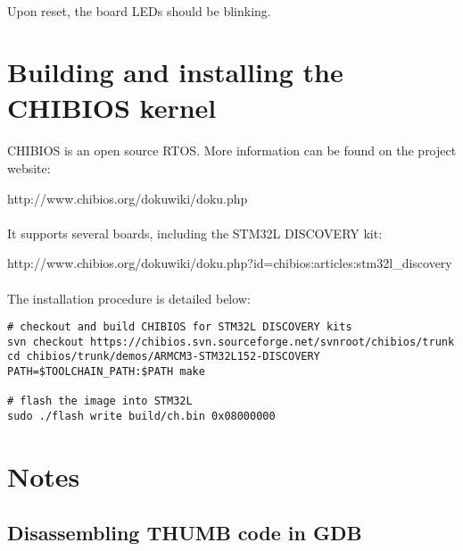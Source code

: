 \documentclass[a4paper, 11pt]{article}
\begin{document}
\paragraph{}
Upon reset, the board LEDs should be blinking.

\newpage
\section{Building and installing the CHIBIOS kernel}
\paragraph{}
CHIBIOS is an open source RTOS. More information can be found on the project website:
\begin{center}
http://www.chibios.org/dokuwiki/doku.php
\end{center}

\paragraph{}
It supports several boards, including the STM32L DISCOVERY kit:
\begin{center}
http://www.chibios.org/dokuwiki/doku.php?id=chibios:articles:stm32l\_discovery
\end{center}

\paragraph{}
The installation procedure is detailed below:\\
\begin{small}
\begin{lstlisting}[frame=tb]
# checkout and build CHIBIOS for STM32L DISCOVERY kits
svn checkout https://chibios.svn.sourceforge.net/svnroot/chibios/trunk
cd chibios/trunk/demos/ARMCM3-STM32L152-DISCOVERY
PATH=$TOOLCHAIN_PATH:$PATH make

# flash the image into STM32L
sudo ./flash write build/ch.bin 0x08000000
\end{lstlisting}
\end{small}

\newpage
\section{Notes}

\subsection{Disassembling THUMB code in GDB}
\end{document}
